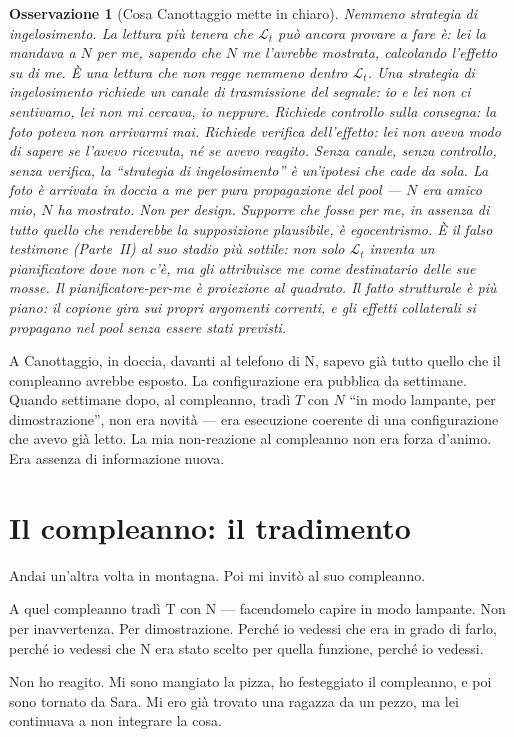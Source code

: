 \documentclass[
    oneside,                 %
    openany,                 %
    titlepage,
    11pt,
    a4paper,
    italian,
    DIV=14,                  %
    headinclude,
    footinclude=true,
    cleardoublepage=empty
]{scrbook}
\theoremstyle{ctplain}
\theoremstyle{ctdef}
\theoremstyle{ctrem}
\newtheorem*{oss}{Osservazione}
\newcommand{\Lt}{\mathcal{L}_t}
\begin{document}
\begin{oss}[Cosa Canottaggio mette in chiaro]
\emph{Nemmeno strategia di ingelosimento.} La lettura più tenera che $\Lt$ può ancora provare a fare è: lei la mandava a $N$ \emph{per me}, sapendo che $N$ me l'avrebbe mostrata, calcolando l'effetto su di me. È una lettura che non regge nemmeno dentro $\Lt$. Una strategia di ingelosimento richiede un canale di trasmissione del segnale: io e lei non ci sentivamo, lei non mi cercava, io neppure. Richiede controllo sulla consegna: la foto poteva non arrivarmi mai. Richiede verifica dell'effetto: lei non aveva modo di sapere se l'avevo ricevuta, né se avevo reagito. Senza canale, senza controllo, senza verifica, la ``strategia di ingelosimento'' è un'ipotesi che cade da sola. La foto è arrivata in doccia a me per pura propagazione del pool --- $N$ era amico mio, $N$ ha mostrato. Non per design. Supporre che fosse per me, in assenza di tutto quello che renderebbe la supposizione plausibile, è egocentrismo. È il falso testimone (Parte~II) al suo stadio più sottile: non solo $\Lt$ inventa un pianificatore dove non c'è, ma gli attribuisce \emph{me} come destinatario delle sue mosse. Il pianificatore-per-me è proiezione al quadrato. Il fatto strutturale è più piano: il copione gira sui propri argomenti correnti, e gli effetti collaterali si propagano nel pool senza essere stati previsti.
\end{oss}

A Canottaggio, in doccia, davanti al telefono di N, sapevo già tutto quello che il compleanno avrebbe esposto. La configurazione era pubblica da settimane. Quando settimane dopo, al compleanno, tradì $T$ con $N$ ``in modo lampante, per dimostrazione'', non era novità --- era esecuzione coerente di una configurazione che avevo già letto. La mia non-reazione al compleanno non era forza d'animo. Era assenza di informazione nuova.

\chapter{Il compleanno: il tradimento}

Andai un'altra volta in montagna. Poi mi invitò al suo compleanno.

A quel compleanno tradì T con N --- facendomelo capire in modo lampante. Non per inavvertenza. Per dimostrazione. Perché io vedessi che era in grado di farlo, perché io vedessi che N era stato scelto per quella funzione, perché io vedessi.

Non ho reagito. Mi sono mangiato la pizza, ho festeggiato il compleanno, e poi sono tornato da Sara. Mi ero già trovato una ragazza da un pezzo, ma lei continuava a non integrare la cosa.
\end{document}
